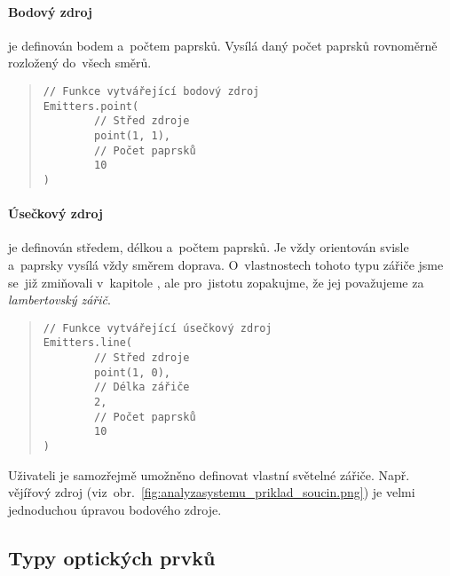 \paragraph{Bodový zdroj} je definován bodem a~počtem paprsků. Vysílá daný počet paprsků rovnoměrně rozložený do~všech směrů.

\begin{minipage}{\textwidth}\begin{quote}\begin{lstlisting}
// Funkce vytvářející bodový zdroj
Emitters.point(
        // Střed zdroje
        point(1, 1),
        // Počet paprsků
        10
)
\end{lstlisting}\end{quote}\end{minipage}


\paragraph{Úsečkový zdroj} je definován středem, délkou a~počtem paprsků. Je vždy orientován svisle a~paprsky vysílá vždy směrem doprava. O~vlastnostech tohoto typu zářiče jsme se~již zmiňovali v~kapitole , ale pro~jistotu zopakujme, že jej považujeme za \emph{lambertovský zářič}. \parencite{fotometrie}

\begin{minipage}{\textwidth}\begin{quote}\begin{lstlisting}
// Funkce vytvářející úsečkový zdroj
Emitters.line(
        // Střed zdroje
        point(1, 0),
        // Délka zářiče
        2,
        // Počet paprsků
        10
)
\end{lstlisting}\end{quote}\end{minipage}


Uživateli je samozřejmě umožněno definovat vlastní světelné zářiče. Např. vějířový zdroj (viz~obr.~\ref{fig:analyzasystemu_priklad_soucin.png}) je velmi jednoduchou úpravou bodového zdroje.


\subsection{Typy optických prvků}

